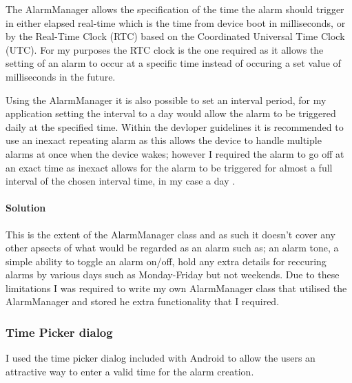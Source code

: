The AlarmManager allows the specification of the time the alarm should
trigger in either elapsed real-time which is the time from device boot
in milliseconds, or by the Real-Time Clock (RTC) based on the
Coordinated Universal Time Clock (UTC). For my purposes the RTC clock is
the one required as it allows the setting of an alarm to occur at a
specific time instead of occuring a set value of milliseconds in the
future.

Using the AlarmManager it is also possible to set an interval period,
for my application setting the interval to a day would allow the alarm
to be triggered daily at the specified time. Within the devloper
guidelines it is recommended to use an inexact repeating alarm as this
allows the device to handle multiple alarms at once when the device
wakes; however I required the alarm to go off at an exact time as
inexact allows for the alarm to be triggered for almost a full interval
of the chosen interval time, in my case a day \parencite{alarmManager}.

\paragraph{Solution}\label{solution}

This is the extent of the AlarmManager class and as such it doesn't
cover any other apsects of what would be regarded as an alarm such as;
an alarm tone, a simple ability to toggle an alarm on/off, hold any
extra details for reccuring alarms by various days such as Monday-Friday
but not weekends. Due to these limitations I was required to write my
own AlarmManager class that utilised the AlarmManager and stored he
extra functionality that I required.

\subsubsection{Time Picker dialog}\label{time-picker-dialog}

I used the time picker dialog included with Android to allow the users
an attractive way to enter a valid time for the alarm creation.

